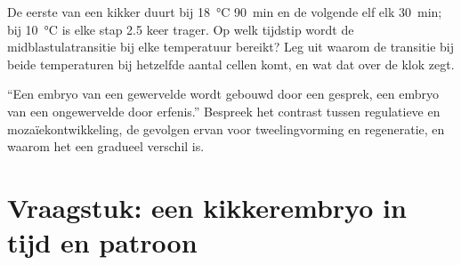 \begin{exercise}[$\star\star\star$]\label{exo:b2:vertebrate-development:11}
De eerste  van een kikker duurt bij \qty{18}{\celsius}
\qty{90}{min} en de volgende elf elk
\qty{30}{min}; bij \qty{10}{\celsius} is elke
stap 2.5 keer trager. Op welk tijdstip wordt de midblastulatransitie bij
elke temperatuur bereikt? Leg uit waarom de transitie bij beide temperaturen
bij hetzelfde aantal cellen komt, en wat dat over de klok zegt.
\end{exercise}

\begin{exercise}[$\star\star\star$]\label{exo:b2:vertebrate-development:12}
``Een embryo van een gewervelde wordt gebouwd door een gesprek, een
embryo van een ongewervelde door erfenis.'' Bespreek het contrast tussen
regulatieve en mozaïekontwikkeling, de gevolgen ervan voor tweelingvorming
en regeneratie, en waarom het een gradueel verschil is.
\end{exercise}

\section{Vraagstuk: een kikkerembryo in tijd en patroon}

